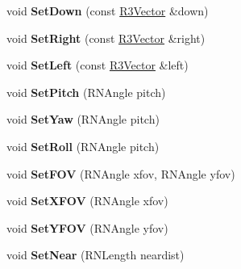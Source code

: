 \begin{DoxyCompactItemize}
\item 
void {\bfseries Set\+Down} (const \hyperlink{class_r3_vector}{R3\+Vector} \&down)\hypertarget{class_r3_camera_a779aca97a6621f2d7c346f4533971c70}{}\label{class_r3_camera_a779aca97a6621f2d7c346f4533971c70}

\item 
void {\bfseries Set\+Right} (const \hyperlink{class_r3_vector}{R3\+Vector} \&right)\hypertarget{class_r3_camera_af503b78f050c6284b124648b99101f61}{}\label{class_r3_camera_af503b78f050c6284b124648b99101f61}

\item 
void {\bfseries Set\+Left} (const \hyperlink{class_r3_vector}{R3\+Vector} \&left)\hypertarget{class_r3_camera_ad6abd43608bb36c9bb2bfd78c1705c63}{}\label{class_r3_camera_ad6abd43608bb36c9bb2bfd78c1705c63}

\item 
void {\bfseries Set\+Pitch} (R\+N\+Angle pitch)\hypertarget{class_r3_camera_ad10cc84643d672049e0bae6c033c03c6}{}\label{class_r3_camera_ad10cc84643d672049e0bae6c033c03c6}

\item 
void {\bfseries Set\+Yaw} (R\+N\+Angle pitch)\hypertarget{class_r3_camera_a50b2d4c41efdd3442133860f90b3b5fe}{}\label{class_r3_camera_a50b2d4c41efdd3442133860f90b3b5fe}

\item 
void {\bfseries Set\+Roll} (R\+N\+Angle pitch)\hypertarget{class_r3_camera_ab5228493697ec4db80d323a2084e96db}{}\label{class_r3_camera_ab5228493697ec4db80d323a2084e96db}

\item 
void {\bfseries Set\+F\+OV} (R\+N\+Angle xfov, R\+N\+Angle yfov)\hypertarget{class_r3_camera_a12d5c18e4558d66e556175b8abd4e864}{}\label{class_r3_camera_a12d5c18e4558d66e556175b8abd4e864}

\item 
void {\bfseries Set\+X\+F\+OV} (R\+N\+Angle xfov)\hypertarget{class_r3_camera_a538ccb3d426eca08e56c8da7a274b405}{}\label{class_r3_camera_a538ccb3d426eca08e56c8da7a274b405}

\item 
void {\bfseries Set\+Y\+F\+OV} (R\+N\+Angle yfov)\hypertarget{class_r3_camera_afeb70ad1f48448154c2330cc625d7387}{}\label{class_r3_camera_afeb70ad1f48448154c2330cc625d7387}

\item 
void {\bfseries Set\+Near} (R\+N\+Length neardist)\hypertarget{class_r3_camera_aba6703e86cab9b6b3b1707ff27995642}{}\label{class_r3_camera_aba6703e86cab9b6b3b1707ff27995642}


\end{DoxyCompactItemize}
